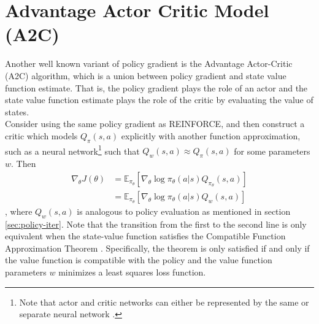\documentclass[12pt]{report}
\begin{document}
\section{Advantage Actor Critic Model (A2C)}

Another well known variant of policy gradient is the Advantage Actor-Critic (A2C) algorithm, which is a union between policy gradient and state value function estimate. That is, the policy gradient plays the role of an actor and the state value function estimate plays the role of the critic by evaluating the value of states.\\

Consider using the same policy gradient as REINFORCE, and then construct a critic which models $Q_\pi(s,a)$ explicitly with another function approximation, such as a neural network\footnote{Note that actor and critic networks can either be represented by the same or separate neural network \cite{haarnoja2018soft1}.} such that $Q_w(s,a) \approx Q_\pi(s,a)$ for some parameters $w$. Then
\begin{align}
    \nabla_\theta J(\theta) &= \mathbb{E}_{\pi_\theta}[\nabla_\theta \log \pi_\theta(a|s) Q_{\pi_\theta}(s,a)] \nonumber\\
    &= \mathbb{E}_{\pi_\theta}[\nabla_\theta \log \pi_\theta(a|s) Q_w(s,a)]
\end{align}
, where $Q_w(s,a)$ is analogous to policy evaluation as mentioned in section \ref{sec:policy-iter}. Note that the transition from the first to the second line is only equivalent when the state-value function satisfies the Compatible Function Approximation Theorem \cite{thomas2017policy} \cite{silver2015}. Specifically, the theorem is only satisfied if and only if the value function is compatible with the policy and the value function parameters $w$ minimizes a least squares loss function.\\
\end{document}
